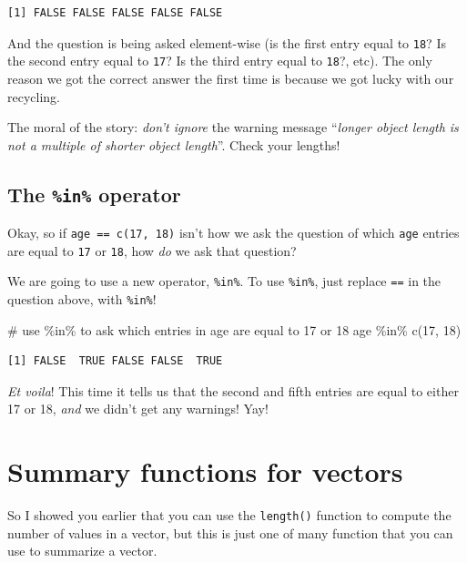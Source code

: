 \documentclass[
  letterpaper,
  DIV=11,
  numbers=noendperiod]{scrreprt}
\newenvironment{Shaded}{\begin{snugshade}}{\end{snugshade}}
\newcommand{\CommentTok}[1]{\textcolor[rgb]{0.37,0.37,0.37}{#1}}
\newcommand{\DecValTok}[1]{\textcolor[rgb]{0.68,0.00,0.00}{#1}}
\newcommand{\FunctionTok}[1]{\textcolor[rgb]{0.28,0.35,0.67}{#1}}
\newcommand{\NormalTok}[1]{\textcolor[rgb]{0.00,0.23,0.31}{#1}}
\newcommand{\SpecialCharTok}[1]{\textcolor[rgb]{0.37,0.37,0.37}{#1}}
\begin{document}
\begin{verbatim}
[1] FALSE FALSE FALSE FALSE FALSE
\end{verbatim}

And the question is being asked element-wise (is the first entry equal
to \texttt{18}? Is the second entry equal to \texttt{17}? Is the third
entry equal to \texttt{18}?, etc). The only reason we got the correct
answer the first time is because we got lucky with our recycling.

The moral of the story: \emph{don't ignore} the warning message
``\emph{longer object length is not a multiple of shorter object
length}''. Check your lengths!

\subsection{\texorpdfstring{The \texttt{\%in\%}
operator}{The \%in\% operator}}\label{the-in-operator}

Okay, so if \texttt{age\ ==\ c(17,\ 18)} isn't how we ask the question
of which \texttt{age} entries are equal to \texttt{17} or \texttt{18},
how \emph{do} we ask that question?

We are going to use a new operator, \texttt{\%in\%}. To use
\texttt{\%in\%}, just replace \texttt{==} in the question above, with
\texttt{\%in\%}!

\begin{Shaded}
\begin{Highlighting}[]
\CommentTok{\# use \%in\% to ask which entries in age are equal to 17 or 18}
\NormalTok{age }\SpecialCharTok{\%in\%} \FunctionTok{c}\NormalTok{(}\DecValTok{17}\NormalTok{, }\DecValTok{18}\NormalTok{) }
\end{Highlighting}
\end{Shaded}

\begin{verbatim}
[1] FALSE  TRUE FALSE FALSE  TRUE
\end{verbatim}

\emph{Et voila}! This time it tells us that the second and fifth entries
are equal to either 17 or 18, \emph{and} we didn't get any warnings!
Yay!

\section{Summary functions for
vectors}\label{summary-functions-for-vectors}

So I showed you earlier that you can use the \texttt{length()} function
to compute the number of values in a vector, but this is just one of
many function that you can use to summarize a vector.
\end{document}
